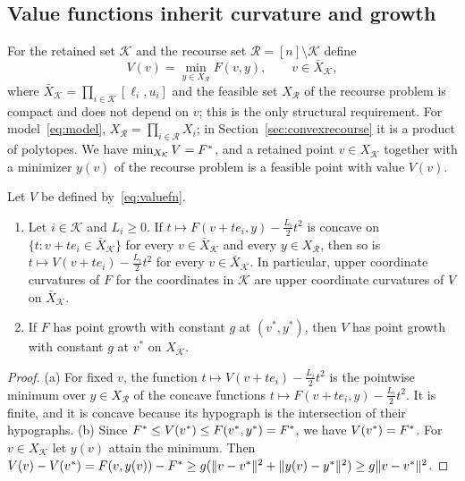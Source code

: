 \subsection{Value functions inherit curvature and growth}\label{sec:valuefn}
For the retained set $\mathcal K$ and the recourse set
$\mathcal R=[n]\setminus\mathcal K$ define
\begin{equation}\label{eq:valuefn}
V(v)=\min_{y\in X_{\mathcal R}}F(v,y),\qquad v\in\bar X_{\mathcal K},
\end{equation}
where $\bar X_{\mathcal K}=\prod_{i\in\mathcal K}[\ell_i,u_i]$ and the
feasible set $X_{\mathcal R}$ of the recourse problem is compact and does
not depend on $v$; this is the only structural requirement. For
model~\eqref{eq:model}, $X_{\mathcal R}=\prod_{i\in\mathcal R}X_i$; in
Section~\ref{sec:convexrecourse} it is a product of polytopes. We have
$\min_{X_{\mathcal K}}V=F^{*}$, and a retained point $v\in X_{\mathcal K}$
together with a minimizer $y(v)$ of the recourse problem is a feasible point
with value $V(v)$.

\begin{lemma}\label{lem:valuefunction}
Let $V$ be defined by~\eqref{eq:valuefn}.
\begin{enumerate}[label=(\alph*)]
\item Let $i\in\mathcal K$ and $L_i\ge0$. If
$t\mapsto F(v+te_i,y)-\frac{L_i}{2}t^2$ is concave on
$\{t:v+te_i\in\bar X_{\mathcal K}\}$ for every $v\in\bar X_{\mathcal K}$
and every $y\in X_{\mathcal R}$, then so is
$t\mapsto V(v+te_i)-\frac{L_i}{2}t^2$ for every $v\in\bar X_{\mathcal K}$.
In particular, upper coordinate curvatures of $F$ for the coordinates in
$\mathcal K$ are upper coordinate curvatures of $V$ on $\bar X_{\mathcal K}$.
\item If $F$ has point growth with constant $g$ at $(v^*,y^*)$, then $V$
has point growth with constant $g$ at $v^*$ on $X_{\mathcal K}$.
\end{enumerate}
\end{lemma}

\begin{proof}
(a) For fixed $v$, the function $t\mapsto V(v+te_i)-\frac{L_i}{2}t^2$ is the
pointwise minimum over $y\in X_{\mathcal R}$ of the concave functions
$t\mapsto F(v+te_i,y)-\frac{L_i}{2}t^2$. It is finite, and it is concave
because its hypograph is the intersection of their hypographs.
(b) Since $F^{*}\le V(v^*)\le F(v^*,y^*)=F^{*}$, we have $V(v^*)=F^{*}$. For
$v\in X_{\mathcal K}$ let $y(v)$ attain the minimum. Then
$V(v)-V(v^*)=F(v,y(v))-F^{*}\ge g(\lVert v-v^*\rVert^2+\lVert y(v)-y^*\rVert^2)\ge
g\lVert v-v^*\rVert^2$.
\end{proof}

